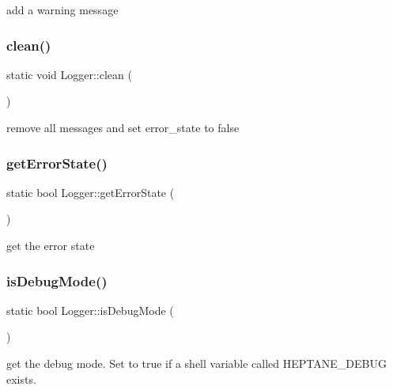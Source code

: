 add a warning message \mbox{\label{classLogger_ad77508d101213f207cc5a0718591674c}} 
\subsubsection{\texorpdfstring{clean()}{clean()}}
{\footnotesize\ttfamily static void Logger\+::clean (\begin{DoxyParamCaption}{ }\end{DoxyParamCaption})\hspace{0.3cm}{\ttfamily [static]}}

remove all messages and set error\+\_\+state to false \mbox{\label{classLogger_a958e10841789b9deaf94b45a1aca119b}} 
\subsubsection{\texorpdfstring{get\+Error\+State()}{getErrorState()}}
{\footnotesize\ttfamily static bool Logger\+::get\+Error\+State (\begin{DoxyParamCaption}{ }\end{DoxyParamCaption})\hspace{0.3cm}{\ttfamily [static]}}

get the error state \mbox{\label{classLogger_af58915accf265cdfe2d2c747c5b58c4e}} 
\subsubsection{\texorpdfstring{is\+Debug\+Mode()}{isDebugMode()}}
{\footnotesize\ttfamily static bool Logger\+::is\+Debug\+Mode (\begin{DoxyParamCaption}{ }\end{DoxyParamCaption})\hspace{0.3cm}{\ttfamily [static]}}

get the debug mode. Set to true if a shell variable called H\+E\+P\+T\+A\+N\+E\+\_\+\+D\+E\+B\+UG exists. \mbox{\label{classLogger_a7d12d63e39ef239d8618c70f320af9f5}} 
